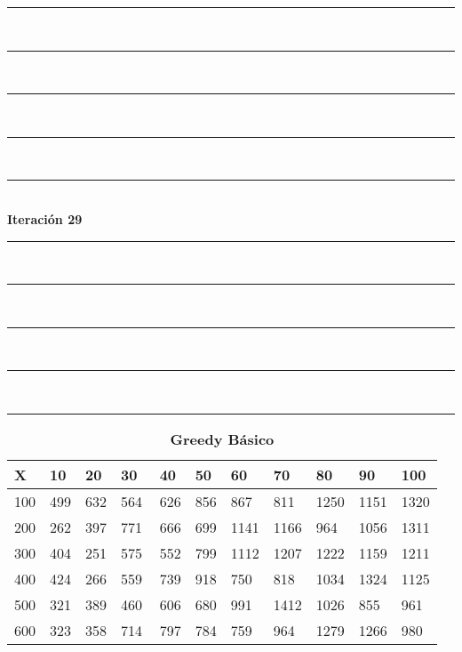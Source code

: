 \documentclass[10pt,letterpaper]{article}
\begin{document}
\newpage 
\begin{center}
\newcommand{\HRule}{\rule{\linewidth}{0.5mm}}
\center
\HRule\\[6cm]
\HRule\\[0.4cm]
\HRule\\[0.4cm]
\HRule\\[0.4cm]
\HRule\\[0.4cm]
{\centering \Huge\bfseries Iteración 29}\\[0.4cm]
\HRule\\[0.4cm]
\HRule\\[0.4cm]
\HRule\\[0.4cm]
\HRule\\[6cm]
\HRule
\end{center}
\newpage 
{}
\begin{center}
\begin{table}\renewcommand{\arraystretch}{2.5}
\caption{\large \textbf{Greedy Básico}}
\centering
\begin{tabular} { |m{0.5cm}|m{1.3cm}|m{1.3cm}|m{1.3cm}|m{1.3cm}|m{1.3cm}|m{1.3cm}|m{1.3cm}|m{1.3cm}|m{1.3cm}|m{1.3cm}|} 
\hline
\rowcolor{Gray}
\centering \textbf{X} & \centering \textbf{10} & \centering \textbf{20} & \centering \textbf{30}\ & \centering \textbf{40} & \centering \textbf{50} & \centering \textbf{60}\ & \centering \textbf{70} & \centering \textbf{80} & \centering \textbf{90}\ & \textbf{100} \\\hline
\cellcolor{Gray}100 & \Large 499 & \Large 632 & \Large 564 & \Large 626 & \Large 856 & \Large 867 & \Large 811 & \Large 1250 & \Large 1151 & \Large 1320 \\
\hline
\cellcolor{Gray}200 & \Large 262 & \Large 397 & \Large 771 & \Large 666 & \Large 699 & \Large 1141 & \Large 1166 & \Large 964 & \Large 1056 & \Large 1311 \\
\hline
\cellcolor{Gray}300 & \Large 404 & \Large 251 & \Large 575 & \Large 552 & \Large 799 & \Large 1112 & \Large 1207 & \Large 1222 & \Large 1159 & \Large 1211 \\
\hline
\cellcolor{Gray}400 & \Large 424 & \Large 266 & \Large 559 & \Large 739 & \Large 918 & \Large 750 & \Large 818 & \Large 1034 & \Large 1324 & \Large 1125 \\
\hline
\cellcolor{Gray}500 & \Large 321 & \Large 389 & \Large 460 & \Large 606 & \Large 680 & \Large 991 & \Large 1412 & \Large 1026 & \Large 855 & \Large 961 \\
\hline
\cellcolor{Gray}600 & \Large 323 & \Large 358 & \Large 714 & \Large 797 & \Large 784 & \Large 759 & \Large 964 & \Large 1279 & \Large 1266 & \Large 980 \\

\end{tabular}
\end{table}
\end{center}
\end{document}
